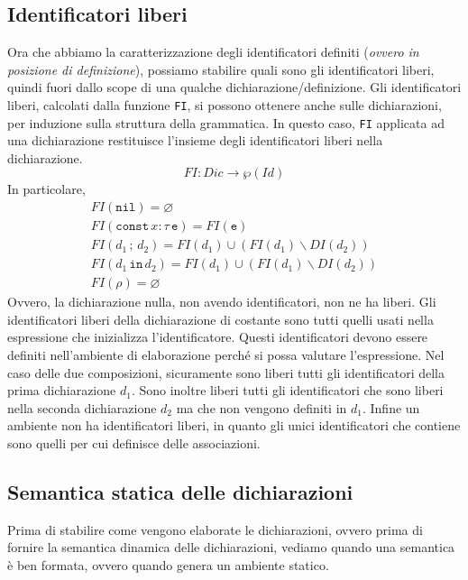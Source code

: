 \documentclass[oneside,a4paper,11pt]{book}
\theoremstyle{italicstyle}
\theoremstyle{normStyle}
\begin{document}
\subsection{Identificatori liberi}
Ora che abbiamo la caratterizzazione degli identificatori definiti
(\textit{ovvero in posizione di definizione}), possiamo stabilire quali sono
gli identificatori liberi, quindi fuori dallo scope di una qualche
dichiarazione/definizione.
Gli identificatori liberi, calcolati dalla funzione \verb|FI|, si possono
ottenere anche sulle dichiarazioni, per induzione sulla struttura della
grammatica. In questo caso, \verb|FI| applicata ad una dichiarazione restituisce
l’insieme degli identificatori liberi nella dichiarazione.
\[
  FI: Dic \rightarrow \wp(Id)
\]
In particolare,
\begin{align*}
  FI({\texttt{nil}})=\varnothing \\
  FI(\texttt{const} \,x: \tau \,\texttt{e}) = FI(\texttt{e}) \\
  FI(d_1\,;\,d_2)= FI(d_1) \cup (FI(d_1) \backslash DI(d_2)) \\
  FI(d_1\,\texttt{in}\,d_2)= FI(d_1) \cup (FI(d_1) \backslash DI(d_2)) \\
  FI(\rho) = \varnothing
\end{align*}
Ovvero, la dichiarazione nulla, non avendo identificatori, non ne ha liberi.
Gli identificatori liberi della dichiarazione di costante sono tutti quelli
usati nella espressione che inizializza l’identificatore. Questi identificatori
devono essere definiti nell’ambiente di elaborazione perché si possa
valutare l’espressione. Nel caso delle due composizioni, sicuramente sono
liberi tutti gli identificatori della prima dichiarazione $d_1$. Sono
inoltre liberi tutti gli identificatori che sono liberi nella seconda
dichiarazione $d_2$ ma che non vengono definiti in $d_1$. Infine un ambiente
non ha identificatori liberi, in quanto gli unici identificatori che
contiene sono quelli per cui definisce delle associazioni.
\subsection{Semantica statica delle dichiarazioni}
Prima di stabilire come vengono elaborate le dichiarazioni, ovvero
prima di fornire la semantica dinamica delle dichiarazioni, vediamo
quando una semantica è ben formata, ovvero quando genera un ambiente
statico.
\end{document}
